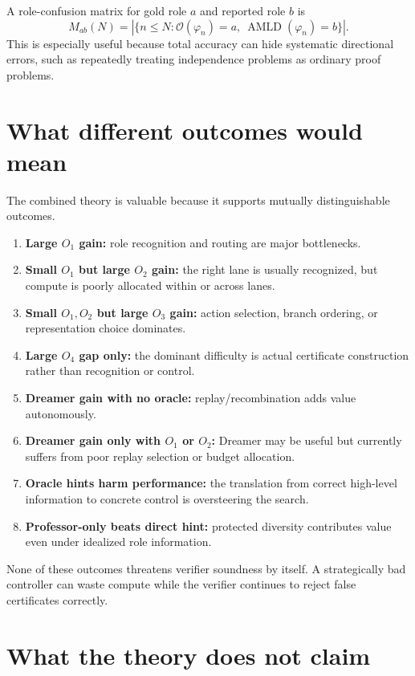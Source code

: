 \documentclass[11pt]{article}
\newcommand{\Oracle}{\mathscr O}
\newcommand{\AMLD}{\operatorname{AMLD}}
\begin{document}
A role-confusion matrix for gold role $a$ and reported role $b$ is
\begin{equation}
M_{ab}(N)=
\left|\{n\le N:\Oracle(\varphi_n)=a,\ \AMLD(\varphi_n)=b\}\right|.
\end{equation}
This is especially useful because total accuracy can hide systematic directional errors, such as repeatedly treating independence problems as ordinary proof problems.

\section{What different outcomes would mean}

The combined theory is valuable because it supports mutually distinguishable outcomes.

\begin{enumerate}[leftmargin=2em]
\item \textbf{Large $O_1$ gain:} role recognition and routing are major bottlenecks.
\item \textbf{Small $O_1$ but large $O_2$ gain:} the right lane is usually recognized, but compute is poorly allocated within or across lanes.
\item \textbf{Small $O_1,O_2$ but large $O_3$ gain:} action selection, branch ordering, or representation choice dominates.
\item \textbf{Large $O_4$ gap only:} the dominant difficulty is actual certificate construction rather than recognition or control.
\item \textbf{Dreamer gain with no oracle:} replay/recombination adds value autonomously.
\item \textbf{Dreamer gain only with $O_1$ or $O_2$:} Dreamer may be useful but currently suffers from poor replay selection or budget allocation.
\item \textbf{Oracle hints harm performance:} the translation from correct high-level information to concrete control is oversteering the search.
\item \textbf{Professor-only beats direct hint:} protected diversity contributes value even under idealized role information.
\end{enumerate}

None of these outcomes threatens verifier soundness by itself. A strategically bad controller can waste compute while the verifier continues to reject false certificates correctly.

\section{What the theory does not claim}
\end{document}
